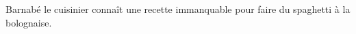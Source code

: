 
\begin{exercice}\label{exo2smath-0111}

    Barnabé le cuisinier connaît une recette immanquable pour faire du spaghetti à la bolognaise.

\end{exercice}
